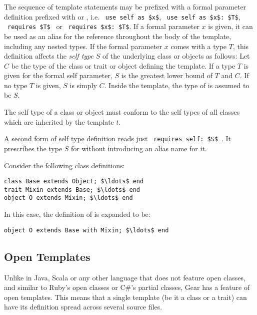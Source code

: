 The sequence of template statements may be prefixed with a formal parameter definition prefixed with  or , i.e. ~\lstinline!use self as $x$!, ~\lstinline!use self as $x$: $T$!, ~\lstinline!requires $T$!~ or ~\lstinline!requires $x$: $T$!. If a formal parameter $x$ is given, it can be used as an alias for the reference  throughout the body of the template, including any nested types. If the formal parameter $x$ comes with a type $T$, this definition affects the {\em self type} $S$ of the underlying class or objects as follows: Let $C$ be the type of the class or trait or object defining the template. If a type $T$ is given for the formal self parameter, $S$ is the greatest lower bound of $T$ and $C$. If no type $T$ is given, $S$ is simply $C$. Inside the template, the type of  is assumed to be $S$. 

The self type of a class or object must conform to the self types of all classes which are inherited by the template $t$. 

A second form of self type definition reads just ~\lstinline!requires self: $S$!~. It prescribes the type $S$ for  without introducing an alias name for it. 


\example Consider the following class definitions:
\begin{lstlisting}
class Base extends Object; $\ldots$ end
trait Mixin extends Base; $\ldots$ end
object O extends Mixin; $\ldots$ end
\end{lstlisting}
In this case, the definition of  is expanded to be:
\begin{lstlisting}
object O extends Base with Mixin; $\ldots$ end
\end{lstlisting}





\subsection{Open Templates}
\label{sec:open-templates}

Unlike in Java, Scala or any other language that does not feature open classes, and similar to Ruby's open classes or C\#'s partial classes, Gear has a feature of open templates. This means that a single template (be it a class or a trait) can have its definition spread across several source files. 

